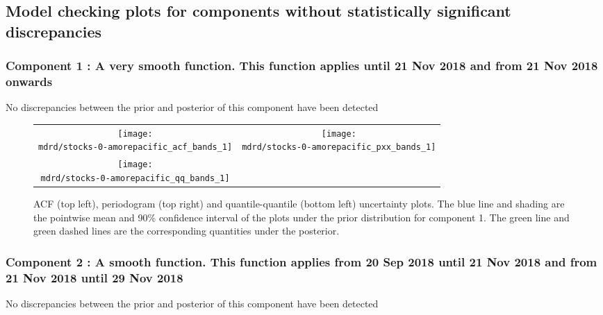 \documentclass{article} %
\begin{document}
\subsection{Model checking plots for components without statistically significant discrepancies}

\subsubsection{Component 1 : A very smooth function. This function applies until 21 Nov 2018 and from 21 Nov 2018 onwards}

No discrepancies between the prior and posterior of this component have been detected

\begin{figure}[H]
\newcommand{\wmgd}{0.5\columnwidth}
\newcommand{\hmgd}{3.0cm}
\newcommand{\mdrd}{stocks-0-amorepacific}
\newcommand{\mbm}{\hspace{-0.3cm}}
\begin{tabular}{cc}
\mbm \texttt{[image: \\mdrd/stocks-0-amorepacific\_acf\_bands\_1]} & \texttt{[image: \\mdrd/stocks-0-amorepacific\_pxx\_bands\_1]} \\
\mbm \texttt{[image: \\mdrd/stocks-0-amorepacific\_qq\_bands\_1]}
\end{tabular}
\caption{
ACF (top left), periodogram (top right) and quantile-quantile (bottom left) uncertainty plots.
The blue line and shading are the pointwise mean and 90\% confidence interval of the plots under the prior distribution for component 1.
The green line and green dashed lines are the corresponding quantities under the posterior.}
\label{fig:check1}
\end{figure}

\subsubsection{Component 2 : A smooth function. This function applies from 20 Sep 2018 until 21 Nov 2018 and from 21 Nov 2018 until 29 Nov 2018}

No discrepancies between the prior and posterior of this component have been detected
\end{document}
